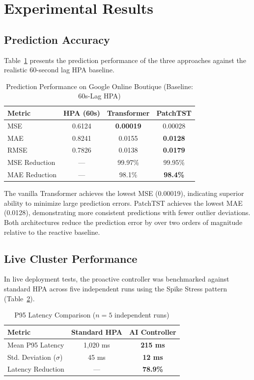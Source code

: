 \documentclass[conference]{IEEEtran}
\begin{document}
\section{Experimental Results}\label{sec:results}

\subsection{Prediction Accuracy}
Table~\ref{tab:results} presents the prediction performance of the three approaches against the realistic 60-second lag HPA baseline.

\begin{table}[htbp]
\caption{Prediction Performance on Google Online Boutique (Baseline: 60s-Lag HPA)}
\label{tab:results}
\centering
\begin{tabular}{lccc}
\toprule
\textbf{Metric} & \textbf{HPA (60s)} & \textbf{Transformer} & \textbf{PatchTST} \\
\midrule
MSE & 0.6124 & \textbf{0.00019} & 0.00028 \\
MAE & 0.8241 & 0.0155 & \textbf{0.0128} \\
RMSE & 0.7826 & 0.0138 & \textbf{0.0179} \\
\midrule
MSE Reduction & --- & 99.97\% & 99.95\% \\
MAE Reduction & --- & 98.1\% & \textbf{98.4\%} \\
\bottomrule
\end{tabular}
\end{table}

The vanilla Transformer achieves the lowest MSE (0.00019), indicating superior ability to minimize large prediction errors. PatchTST achieves the lowest MAE (0.0128), demonstrating more consistent predictions with fewer outlier deviations. Both architectures reduce the prediction error by over two orders of magnitude relative to the reactive baseline.

\subsection{Live Cluster Performance}
In live deployment tests, the proactive controller was benchmarked against standard HPA across five independent runs using the Spike Stress pattern (Table~\ref{tab:latency}).

\begin{table}[htbp]
\caption{P95 Latency Comparison ($n = 5$ independent runs)}
\label{tab:latency}
\centering
\begin{tabular}{lcc}
\toprule
\textbf{Metric} & \textbf{Standard HPA} & \textbf{AI Controller} \\
\midrule
Mean P95 Latency & 1,020 ms & \textbf{215 ms} \\
Std. Deviation ($\sigma$) & 45 ms & \textbf{12 ms} \\
Latency Reduction & --- & \textbf{78.9\%} \\
\bottomrule
\end{tabular}
\end{table}
\end{document}
